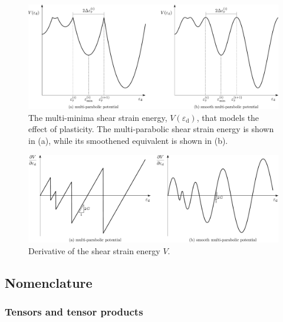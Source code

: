 \documentclass[times,namecite]{goose-article}
\begin{document}
\begin{figure}[htp]
  \centering
  \includegraphics[width=1.\textwidth]{figures/potential_V-plas}
  \caption{The multi-minima shear strain energy, $V ( \varepsilon_\mathrm{d} )$, that models the effect of plasticity. The multi-parabolic shear strain energy is shown in (a), while its smoothened equivalent is shown in (b).}
  \label{fig:V:plas}
\end{figure}

\begin{figure}[htp]
  \centering
  \includegraphics[width=1.\textwidth]{figures/potential_dV-plas}
  \caption{Derivative of the shear strain energy $V$.}
  \label{fig:dV:plas}
\end{figure}

\subsection{Nomenclature}
\label{sec:nomenclature}

\subsubsection{Tensors and tensor products}
\label{sec:nomenclature:tensor}
\end{document}
